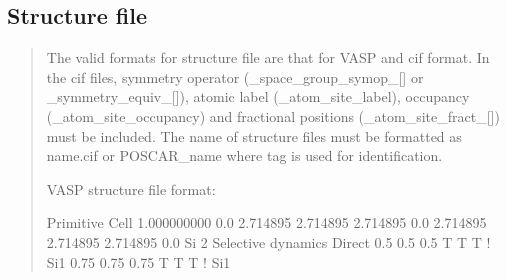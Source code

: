 \documentclass[letterpaper,10pt,english]{sphinxmanual}
\begin{document}
\subsection{Structure file}
\label{\detokenize{Input/Input_files:structure-file}}\begin{quote}

The valid formats for structure file are that for VASP and cif format. In the cif files,
symmetry operator (\_space\_group\_symop\_{[}{]} or \_symmetry\_equiv\_{[}{]}), atomic label (\_atom\_site\_label),
occupancy (\_atom\_site\_occupancy) and fractional positions (\_atom\_site\_fract\_{[}{]}) must be included.
The name of structure files must be formatted as name.cif or POSCAR\_name where tag is used for identification.

VASP structure file format:

\begin{sphinxVerbatim}[commandchars=\\\{\}]
Primitive Cell
   1.000000000
      0.0    2.714895    2.714895
      2.714895    0.0    2.714895
      2.714895    2.714895    0.0
    Si
    2
Selective dynamics
Direct
    0.5    0.5    0.5  T  T  T ! Si1
    0.75    0.75    0.75  T  T  T ! Si1
\end{sphinxVerbatim}
\end{quote}
\end{document}
